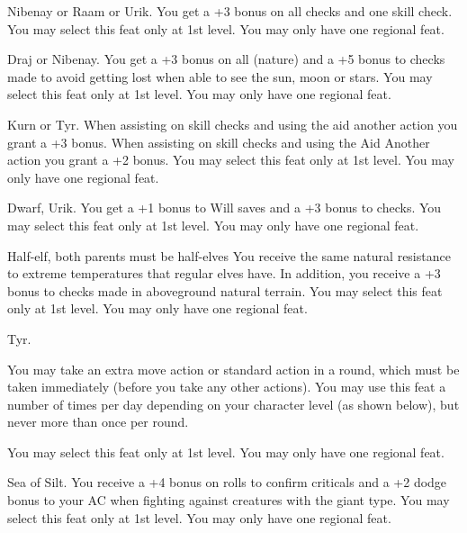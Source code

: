 
{}
{Nibenay or Raam or Urik.}
{You get a +3 bonus on all  checks and one  skill check.}
{}
{You may select this feat only at 1st level. You may only have one regional feat.}

{}
{Draj or Nibenay.}
{You get a +3 bonus on all  (nature) and a +5 bonus to  checks made to avoid getting lost when able to see the sun, moon or stars.}
{}
{You may select this feat only at 1st level. You may only have one regional feat.}

{}
{Kurn or Tyr.}
{When assisting on skill checks and using the aid another action you grant a +3 bonus.}
{When assisting on skill checks and using the Aid Another action you grant a +2 bonus.}
{You may select this feat only at 1st level. You may only have one regional feat.}

{}
{Dwarf, Urik.}
{You get a +1 bonus to Will saves and a +3 bonus to  checks.}
{}
{You may select this feat only at 1st level. You may only have one regional feat.}

{}
{Half-elf, both parents must be half-elves}
{You receive the same natural resistance to extreme temperatures that regular elves have. In addition, you receive a +3 bonus to  checks made in aboveground natural terrain.}
{}
{You may select this feat only at 1st level. You may only have one regional feat.}

{}
{Tyr.}
{You may take an extra move action or standard action in a round, which must be taken immediately (before you take any other actions). You may use this feat a number of times per day depending on your character level (as shown below), but never more than once per round.

}
{}
{You may select this feat only at 1st level. You may only have one regional feat.}

{}
{Sea of Silt.}
{You receive a +4 bonus on rolls to confirm criticals and a +2 dodge bonus to your AC when fighting against creatures with the giant type.}
{}
{You may select this feat only at 1st level. You may only have one regional feat.}

